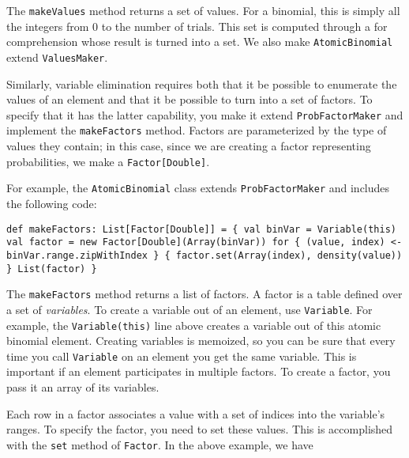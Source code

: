 The \texttt{makeValues} method returns a set of values. For a binomial, this is simply all the integers from
0 to the number of trials. This set is computed through a for comprehension whose result is turned into a set. We also make \texttt{AtomicBinomial} extend \texttt{ValuesMaker}.

Similarly, variable elimination requires both that it be possible to enumerate the values of an element and that it be possible to turn into a set of factors. To specify that it has the latter capability, you make it
extend \texttt{ProbFactorMaker} and implement the \texttt{makeFactors} method. Factors are parameterized by the type of values they contain; in this case, since we are creating a factor representing probabilities, we make a \texttt{Factor[Double]}.

For example, the \texttt{AtomicBinomial} class extends \texttt{ProbFactorMaker} and includes the following code:

\begin{flushleft}
\texttt{def makeFactors: List[Factor[Double]] = \{
\newline \tab val binVar = Variable(this)
\newline \tab val factor = new Factor[Double](Array(binVar))
\newline \tab for \{ (value, index) <- binVar.range.zipWithIndex \} \{
\newline \tab factor.set(Array(index), density(value))
\newline \} 
\newline \tab List(factor)
\newline \}
}
\end{flushleft}

The \texttt{makeFactors} method returns a list of factors. A factor is a table defined over a set of \emph{variables}. To create a variable out of an element, use \texttt{Variable}. For example, the \texttt{Variable(this)} line above creates a variable out of this atomic binomial element. Creating variables is memoized, so you can be sure that every time you call \texttt{Variable} on an element you get the same variable. This is important if an element participates in multiple factors. To create a factor, you pass it an array of its variables.

Each row in a factor associates a value with a set of indices into the variable's ranges. To specify the factor, you need to set these values. This is accomplished with the \texttt{set} method of \texttt{Factor}. In the above example, we have

